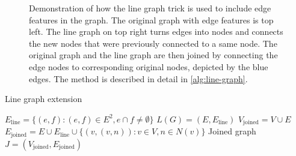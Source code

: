 \documentclass[english, 12pt, a4paper, sci, utf8, a-2b, online]{aaltothesis}
\begin{document}
\begin{figure}[t]
    \centering
    
    \caption{Demonstration of how the line graph trick is used to include edge features in the graph. The original graph with edge features is top left. The line graph on top right turns edges into nodes and connects the new nodes that were previously connected to a same node. The original graph and the line graph are then joined by connecting the edge nodes to corresponding original nodes, depicted by the  blue edges. The method is described in detail in \cref{alg:line-graph}.}
    \label{fig:line-graph}
\end{figure}


\begin{algorithm}[b]

    \caption{Line graph extension}
    \label{alg:line-graph}
    \begin{algorithmic}
        \State $E_{\text{line}} = \{(e, f) : (e, f) \in E^2, e\cap f \neq \emptyset\}$
        \State $L(G) = (E, E_{\text{line}})$ 
        \State $V_\text{joined} = V \cup E$
        \State $E_\text{joined} = E \cup E_\text{line} \cup \{(v, (v, n)) : v \in V, n \in N(v)\}$
        \State Joined graph $J = (V_\text{joined}, E_\text{joined})$
    \end{algorithmic}
\end{algorithm}



\end{document}

